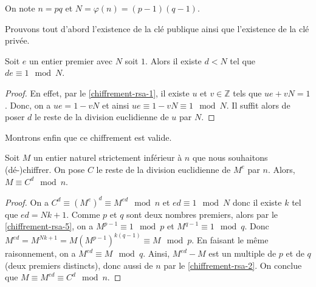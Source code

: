   \begin{notation}
    On note $n = pq$ et $N = \varphi(n) = (p-1)(q-1)$.
  \end{notation}
  
  Prouvons tout d'abord l'existence de la clé publique ainsi que l'existence de la clé privée.
  
  \begin{proposition}
    Soit $e$ un entier premier avec $N$ soit $1$. Alors il existe $d < N$ tel que $de \equiv 1 \mod N$.
  \end{proposition}
  
  \begin{proof}
    En effet, par le \cref{chiffrement-rsa-1}, il existe $u$ et $v \in \mathbb{Z}$ tels que $ue + vN = 1$. Donc, on a $ue = 1 - vN$ et ainsi $ue \equiv 1 - vN \equiv 1 \mod N$. Il suffit alors de poser $d$ le reste de la division euclidienne de $u$ par $N$.
  \end{proof}
  
  Montrons enfin que ce chiffrement est valide.
  
  \begin{proposition}
    Soit $M$ un entier naturel strictement inférieur à $n$ que nous souhaitons (dé-)chiffrer. On pose $C$ le reste de la division euclidienne de $M^e$ par $n$. Alors, $M \equiv C^d \mod n$.
  \end{proposition}
  
  \begin{proof}
    On a $C^d \equiv (M^e)^d \equiv M^{ed} \mod n$ et $ed \equiv 1 \mod N$ donc il existe $k$ tel que $ed = Nk + 1$. Comme $p$ et $q$ sont deux nombres premiers, alors par le \cref{chiffrement-rsa-5}, on a $M^{p-1} \equiv 1 \mod p$ et $M^{q-1} \equiv 1 \mod q$. Donc $M^{ed} = M^{Nk + 1} = M(M^{p-1})^{k(q-1)} \equiv M \mod p$. En faisant le même raisonnement, on a $M^{ed} \equiv M \mod q$. Ainsi, $M^{ed}-M$ est un multiple de $p$ et de $q$ (deux premiers distincts), donc aussi de $n$ par le \cref{chiffrement-rsa-2}. On conclue que $M \equiv M^{ed} \equiv C^d \mod n$.
  \end{proof}

